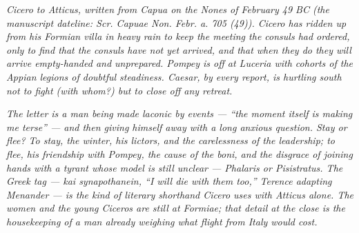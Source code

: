 
\textit{Cicero to Atticus, written from Capua on the
Nones of February 49 BC (the manuscript dateline:
\textit{Scr. Capuae Non. Febr. a. 705 (49)}). Cicero
has ridden up from his Formian villa in heavy rain to
keep the meeting the consuls had ordered, only to find
that the consuls have not yet arrived, and that when
they do they will arrive empty-handed and unprepared.
Pompey is off at Luceria with cohorts of the Appian
legions of doubtful steadiness. Caesar, by every
report, is hurtling south not to fight (with whom?)
but to close off any retreat.}

\textit{The letter is a man being made laconic by
events --- ``the moment itself is making me terse'' ---
and then giving himself away with a long anxious
question. Stay or flee? To stay, the winter, his
lictors, and the carelessness of the leadership; to
flee, his friendship with Pompey, the cause of the
\emph{boni}, and the disgrace of joining hands with a
tyrant whose model is still unclear --- Phalaris or
Pisistratus. The Greek tag --- \emph{kai
synapothanein}, ``I will die with them too,'' Terence
adapting Menander --- is the kind of literary
shorthand Cicero uses with Atticus alone. The women
and the young Ciceros are still at Formiae; that
detail at the close is the housekeeping of a man
already weighing what flight from Italy would cost.}
